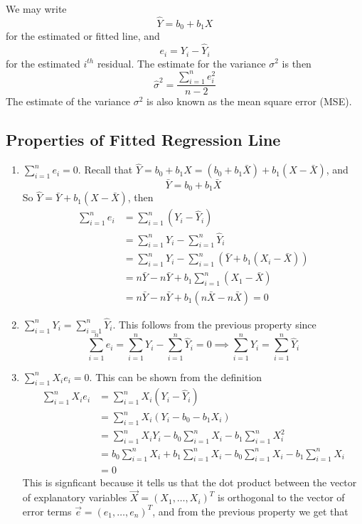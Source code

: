 \noindent
We may write 
\[\hat{Y} = b_0 + b_1X\]
for the estimated or fitted line, and 
\[e_i = Y_i - \hat{Y}_i\]
for the estimated $i^{th}$ residual. The estimate for the variance $\sigma^2$ is then 
\[\hat{\sigma}^2 = \frac{\sum_{i=1}^n e_i^2}{n-2}\]
The estimate of the variance $\sigma^2$ is also known as the mean square error (MSE). 
\subsection{Properties of Fitted Regression Line}
\begin{enumerate}[label=(\roman*)]
    \item $\sum\limits_{i=1}^n e_i = 0$. Recall that $\hat{Y} = b_0 + b_1X = (b_0 + b_1\bar{X}) + b_1(X - \bar{X})$, and 
    \[\bar{Y} = b_0 + b_1\bar{X}\]
    So $\hat{Y} = \bar{Y} + b_1(X - \bar{X})$, then
    \begin{align*}
        \sum_{i=1}^n e_i &= \sum_{i=1}^n (Y_i - \hat{Y}_i)\\
        &= \sum_{i=1}^n Y_i - \sum_{i=1}^n \hat{Y}_i\\
        &= \sum_{i=1}^n Y_i - \sum_{i=1}^n (\bar{Y} + b_1(X_i - \bar{X}))\\
        &= n\bar{Y} - n\bar{Y} + b_1\sum_{i=1}^n (X_1 - \bar{X})\\
        &= n\bar{Y} - n\bar{Y} + b_1(n\bar{X} - n\bar{X}) = 0
    \end{align*}
    \item $\sum\limits_{i=1}^n Y_i = \sum\limits_{i=1}^n \hat{Y}_i$. This follows from the previous property since 
    \[\sum_{i=1}^n e_i = \sum_{i=1}^n Y_i - \sum_{i=1}^n \hat{Y}_i = 0 \implies \sum_{i=1}^n Y_i = \sum_{i=1}^n \hat{Y}_i\]
    \item $\sum\limits_{i=1}^n X_ie_i = 0$. This can be shown from the definition
    \begin{align*}
        \sum_{i=1}^n X_ie_i &= \sum_{i=1}^n X_i(Y_i - \hat{Y}_i)\\
        &= \sum_{i=1}^n X_i(Y_i - b_0 - b_1X_i)\\
        &= \sum_{i=1}^n X_iY_i - b_0\sum_{i=1}^n X_i - b_1\sum_{i=1}^nX_i^2\\
        &= b_0 \sum_{i=1}^n X_i + b_1\sum_{i=1}^n X_i - b_0 \sum_{i=1}^n X_i - b_1\sum_{i=1}^n X_i\\
        &= 0
    \end{align*}
    This is signficant because it tells us that the dot product between the vector of explanatory variables $\vec{X} = (X_1, \ldots, X_i)^T$ is orthogonal to the vector of error terms $\vec{e} = (e_1, \ldots, e_n)^T$, and from the previous property we get that 

\end{enumerate}

